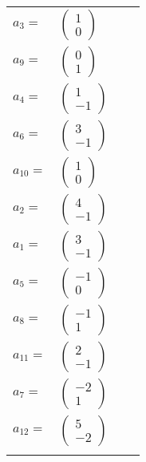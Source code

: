 \documentclass[1p]{elsarticle_modified}
\theoremstyle{definition}
\begin{document}
\begin{tabular}{m{7pt} m{180pt} m{7pt} m{180pt} }
\flushright $a_{3}=$&$\begin{pmatrix}1\\0\end{pmatrix}$ \\
\flushright $a_{9}=$&$\begin{pmatrix}0\\1\end{pmatrix}$ \\
\flushright $a_{4}=$&$\begin{pmatrix}1\\-1\end{pmatrix}$ \\
\flushright $a_{6}=$&$\begin{pmatrix}3\\-1\end{pmatrix}$ \\
\flushright $a_{10}=$&$\begin{pmatrix}1\\0\end{pmatrix}$ \\
\flushright $a_{2}=$&$\begin{pmatrix}4\\-1\end{pmatrix}$ \\
\flushright $a_{1}=$&$\begin{pmatrix}3\\-1\end{pmatrix}$ \\
\flushright $a_{5}=$&$\begin{pmatrix}-1\\0\end{pmatrix}$ \\
\flushright $a_{8}=$&$\begin{pmatrix}-1\\1\end{pmatrix}$ \\
\flushright $a_{11}=$&$\begin{pmatrix}2\\-1\end{pmatrix}$ \\
\flushright $a_{7}=$&$\begin{pmatrix}-2\\1\end{pmatrix}$ \\
\flushright $a_{12}=$&$\begin{pmatrix}5\\-2\end{pmatrix}$\\&\end{tabular}
\end{document}
